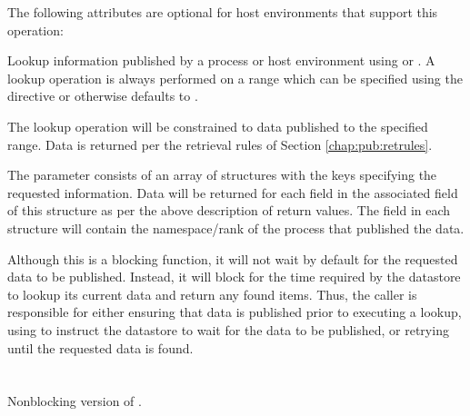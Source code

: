 \optattrstart
The following attributes are optional for host environments that support this operation:


\optattrend

\descr

Lookup information published by a process or host environment using  or .
A lookup operation is always performed on a range which can be specified using the directive  or otherwise defaults to .

The lookup operation will be constrained to data published to the specified range.
Data is returned per the retrieval rules of Section \ref{chap:pub:retrules}.

The  parameter consists of an array of  structures with the keys specifying the requested information.
Data will be returned for each  field in the associated  field of this structure as per the above description of return values. The  field in each  structure will contain the namespace/rank of the process that published the data.

\adviceuserstart
Although this is a blocking function, it will not wait by default for the requested data to be published.
Instead, it will block for the time required by the datastore to lookup its current data and return any found items.
Thus, the caller is responsible for either ensuring that data is published prior to executing a lookup, using  to instruct the datastore to wait for the data to be published, or retrying until the requested data is found.
\adviceuserend


\section{}

\summary

Nonblocking version of .

\format


